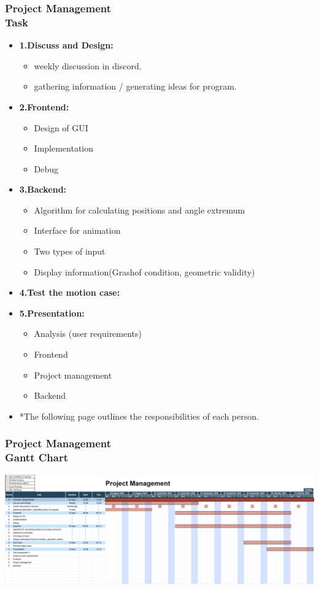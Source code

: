 \documentclass[ucs,10pt]{beamer}
\begin{document}
\begin{frame}
\frametitle{Project Management \\
	\small \color{rwth-blue} Task}
	\begin{itemize}
			\item \textbf{1.Discuss and Design:}
				\begin{itemize}
					\item weekly discussion in discord.
					\item gathering information / generating ideas for program.
				\end{itemize}
			\item \textbf{2.Frontend:}
				\begin{itemize}
					\item Design of GUI
					\item Implementation
					\item Debug
				\end{itemize}
			\item \textbf{3.Backend:}
				\begin{itemize}
				\item Algorithm for calculating positions and angle extremum
				\item Interface for animation
				\item Two types of input
				\item Display information(Grashof condition, geometric validity)
				\end{itemize}
			\item \textbf{4.Test the motion case:}
			\item \textbf{5.Presentation:}
				\begin{itemize}
				\item Analysis (user requirements)
				\item Frontend
				\item Project management
				\item Backend
				\end{itemize}
			\item *The following page outlines the responsibilities of each person.
	\end{itemize}
\end{frame}

\begin{frame}
\frametitle{Project Management \\
	\small \color{rwth-blue} Gantt Chart}

	\begin{center}
		\includegraphics[width=\textwidth]{./figures/project management 10-18.png}
	\end{center}
\end{frame}
\end{document}

